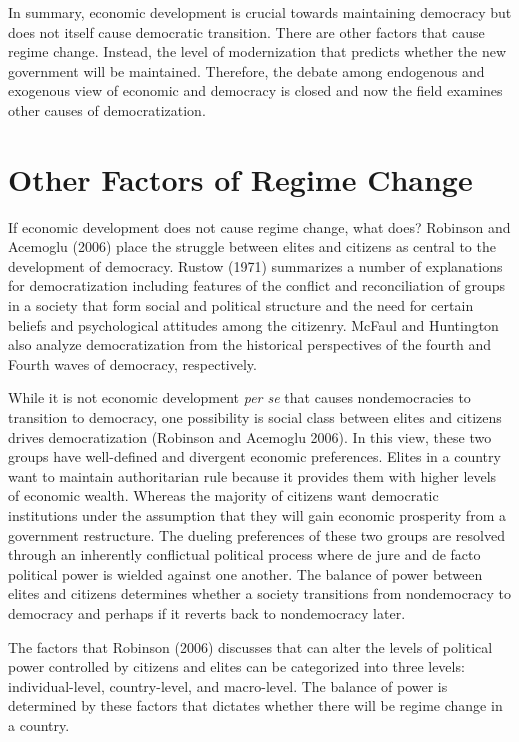 \documentclass[12pt,]{article}
\begin{document}
In summary, economic development is crucial towards maintaining
democracy but does not itself cause democratic transition. There are
other factors that cause regime change. Instead, the level of
modernization that predicts whether the new government will be
maintained. Therefore, the debate among endogenous and exogenous view of
economic and democracy is closed and now the field examines other causes
of democratization.

\hypertarget{other-factors-of-regime-change}{%
\section{Other Factors of Regime
Change}\label{other-factors-of-regime-change}}

If economic development does not cause regime change, what does?
Robinson and Acemoglu (2006) place the struggle between elites and
citizens as central to the development of democracy. Rustow (1971)
summarizes a number of explanations for democratization including
features of the conflict and reconciliation of groups in a society that
form social and political structure and the need for certain beliefs and
psychological attitudes among the citizenry. McFaul and Huntington also
analyze democratization from the historical perspectives of the fourth
and Fourth waves of democracy, respectively.

While it is not economic development \emph{per se} that causes
nondemocracies to transition to democracy, one possibility is social
class between elites and citizens drives democratization (Robinson and
Acemoglu 2006). In this view, these two groups have well-defined and
divergent economic preferences. Elites in a country want to maintain
authoritarian rule because it provides them with higher levels of
economic wealth. Whereas the majority of citizens want democratic
institutions under the assumption that they will gain economic
prosperity from a government restructure. The dueling preferences of
these two groups are resolved through an inherently conflictual
political process where de jure and de facto political power is wielded
against one another. The balance of power between elites and citizens
determines whether a society transitions from nondemocracy to democracy
and perhaps if it reverts back to nondemocracy later.

The factors that Robinson (2006) discusses that can alter the levels of
political power controlled by citizens and elites can be categorized
into three levels: individual-level, country-level, and macro-level. The
balance of power is determined by these factors that dictates whether
there will be regime change in a country.
\end{document}
